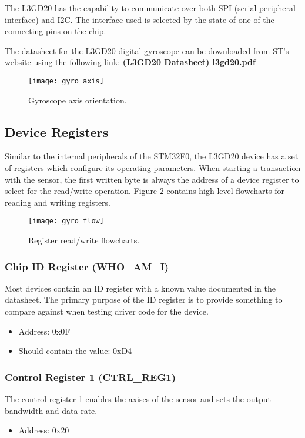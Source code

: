 \documentclass[11pt,fleqn]{book} %
\begin{document}
The L3GD20 has the capability to communicate over both SPI (serial-peripheral-interface) and I2C. The interface used is selected by the state of one of the connecting pins on the chip. 

The datasheet for the L3GD20 digital gyroscope can be downloaded from ST's website using the following link: \href{http://www.st.com/resource/en/datasheet/l3gd20.pdf}{\textbf{(L3GD20 Datasheet) l3gd20.pdf}}

\begin{figure}[]
    \centering\texttt{[image: gyro\_axis]}
    \caption{Gyroscope axis orientation.}
    \label{gyro_axis}
\end{figure}

\subsection{Device Registers}
Similar to the internal peripherals of the STM32F0, the L3GD20 device has a set of registers which configure its operating parameters. When starting a transaction with the sensor, the first written byte is always the address of a device register to select for the read/write operation. Figure \ref{gyro_flow} contains high-level flowcharts for reading and writing registers. 

\begin{figure}[]
    \centering\texttt{[image: gyro\_flow]}
    \caption{Register read/write flowcharts.}
    \label{gyro_flow}
\end{figure}


\subsubsection{Chip ID Register (WHO\_AM\_I)}
Most devices contain an ID register with a known value documented in the datasheet. The primary purpose of the ID register is to provide something to compare against when testing driver code for the device. 
\begin{itemize}
    \item Address: 0x0F
    \item Should contain the value: 0xD4
\end{itemize}

\subsubsection{Control Register 1 (CTRL\_REG1)}
The control register 1 enables the axises of the sensor and sets the output bandwidth and data-rate. 
\begin{itemize}
    \item Address: 0x20
\end{itemize}
\end{document}

